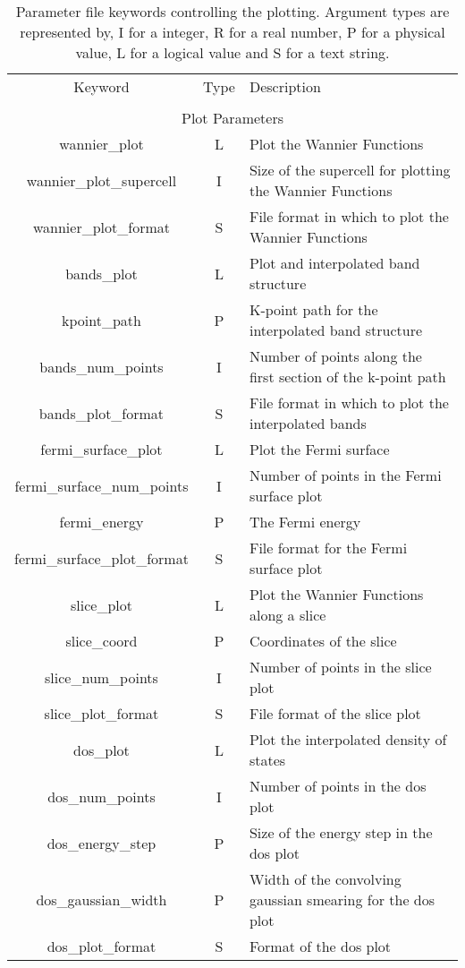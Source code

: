 \begin{table}
\begin{center}
\begin{tabular}{|c|c|p{6cm}|}
\hline
Keyword & Type & Description \\
        &      &             \\
\hline\hline
\multicolumn{3}{|c|}{Plot Parameters} \\
\hline
{\sc wannier\_plot }   & L & Plot the Wannier Functions \\
{\sc wannier\_plot\_supercell }   & I & Size of the supercell for
plotting the Wannier Functions \\
{\sc wannier\_plot\_format }   & S & File format in which to plot the
Wannier Functions \\
{\sc bands\_plot }   & L & Plot and interpolated band structure \\
{\sc kpoint\_path }   & P & K-point path for the interpolated band structure  \\
{\sc bands\_num\_points }   & I & Number of points along the first
section of the k-point path \\
{\sc bands\_plot\_format }   & S & File format in which to plot the
interpolated bands \\
{\sc fermi\_surface\_plot }   & L & Plot the Fermi surface \\
{\sc fermi\_surface\_num\_points }   & I & Number of points in the Fermi
surface plot\\
{\sc fermi\_energy }   & P & The Fermi energy \\
{\sc fermi\_surface\_plot\_format }   & S & File format for the Fermi
surface plot \\
{\sc slice\_plot }   & L & Plot the Wannier Functions along a slice \\
{\sc slice\_coord }   & P & Coordinates of the slice \\
{\sc slice\_num\_points }   & I & Number of points in the slice plot \\
{\sc slice\_plot\_format }   & S & File format of the slice plot \\
{\sc dos\_plot }   & L & Plot the interpolated density of states \\
{\sc dos\_num\_points }   & I & Number of points in the dos plot \\
{\sc dos\_energy\_step }   & P & Size of the energy step in the dos plot \\
{\sc dos\_gaussian\_width }   & P & Width of the convolving gaussian
smearing for the dos plot \\
{\sc dos\_plot\_format }   & S & Format of the dos plot \\
\hline
\end{tabular}
\caption[Parameter file keywords controlling plotting.]
{Parameter file keywords controlling the  plotting.  Argument types
are represented by, I for a integer, R for a real number, P for a
physical value, L for a logical value and S for a text string.}
\label{parameter_keywords6}
\end{center}
\end{table}

